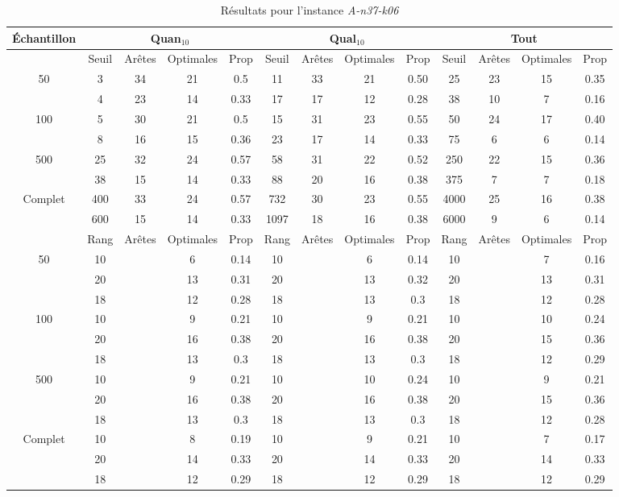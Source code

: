 \documentclass[a4paper,11pt]{article}%
\begin{document}
\begin{table}[h]
\caption{Résultats pour l'instance \emph{A-n37-k06}}
\label{T1}
\begin{center}
\begin{tabular}{|@{}c@{}|@{}c@{}|@{}c@{}|@{}c@{}|@{}c@{}||@{}c@{}|@{}c@{}|@{}c@{}|@{}c@{}||@{}c@{}|@{}c@{}|@{}c@{}|@{}c@{}|}

\hline
 Échantillon & \multicolumn{4}{c|}{Quan$_{10}$} & \multicolumn{4}{c|}{Qual$_{10}$} & \multicolumn{4}{c|}{Tout} \\
 \hline
 & Seuil & Arêtes & Optimales & Prop & Seuil & Arêtes & Optimales & Prop & Seuil & Arêtes & Optimales & Prop \\
 \hline
 50 & 3 & 34 & 21 & 0.5 & 11 & 33 & 21 & 0.50 & 25 & 23 & 15 & 0.35 \\
 \cline{2-13} 
    & 4 & 23 & 14 & 0.33 & 17 & 17 & 12 & 0.28 & 38 & 10 & 7 & 0.16 \\
  \hline
   100 & 5 & 30 & 21 & 0.5 & 15 & 31 & 23 & 0.55 & 50 & 24 & 17 & 0.40 \\
 \cline{2-13} 
    & 8 & 16 & 15 & 0.36 & 23 & 17 & 14 & 0.33 & 75 & 6 & 6 & 0.14 \\
  \hline
   500 & 25 & 32 & 24 & 0.57 & 58 & 31 & 22 & 0.52 & 250 & 22 & 15 & 0.36 \\
 \cline{2-13} 
    & 38 & 15 & 14 & 0.33 & 88 & 20 & 16 & 0.38 & 375 & 7 & 7 & 0.18 \\
  \hline
   Complet & 400 & 33 & 24 & 0.57 & 732 & 30 & 23 & 0.55 & 4000 & 25 & 16 & 0.38 \\
 \cline{2-13} 
    & 600 & 15 & 14 & 0.33 & 1097 & 18 & 16 & 0.38 & 6000 & 9 & 6 & 0.14 \\
  \hline
  \hline
 & Rang & Arêtes & Optimales & Prop & Rang&Arêtes & Optimales & Prop & Rang &Arêtes& Optimales & Prop \\
 \hline
 50 & 10 &  & 6 & 0.14 & 10&  & 6 & 0.14 & 10&  & 7 & 0.16  \\
 \cline{2-13} 
    & 20& & 13 & 0.31 & 20&  & 13 & 0.32 & 20&  & 13 & 0.31  \\
 \cline{2-13} 
    & 18& & 12 & 0.28 & 18& & 13 & 0.3 & 18& & 12 & 0.28  \\
  \hline
   100 & 10&  & 9 & 0.21 & 10&  & 9 & 0.21 & 10&  & 10 & 0.24  \\
 \cline{2-13} 
    & 20& & 16 & 0.38 & 20& & 16 & 0.38 & 20& & 15 & 0.36  \\
  \cline{2-13} 
    & 18& & 13 & 0.3 & 18& & 13 & 0.3 & 18& & 12 & 0.29  \\
  \hline
   500 & 10&  & 9 & 0.21 & 10&  & 10 & 0.24 & 10&  & 9 & 0.21  \\
 \cline{2-13} 
    & 20& & 16 & 0.38 & 20& & 16 & 0.38 & 20& & 15 & 0.36  \\
  \cline{2-13} 
    & 18& & 13 & 0.3 & 18& & 13 & 0.3 & 18& & 12 & 0.28  \\
  \hline
   Complet & 10& & 8 & 0.19&  10& & 9 & 0.21 & 10& & 7 & 0.17  \\
 \cline{2-13} 
    & 20& & 14 & 0.33 & 20& & 14 & 0.33 & 20& & 14 & 0.33  \\
  \cline{2-13} 
    & 18& & 12 & 0.29 & 18& & 12 & 0.29 & 18& & 12 & 0.29  \\
  \hline
  

\end{tabular}
\end{center}
\end{table}
\end{document}
